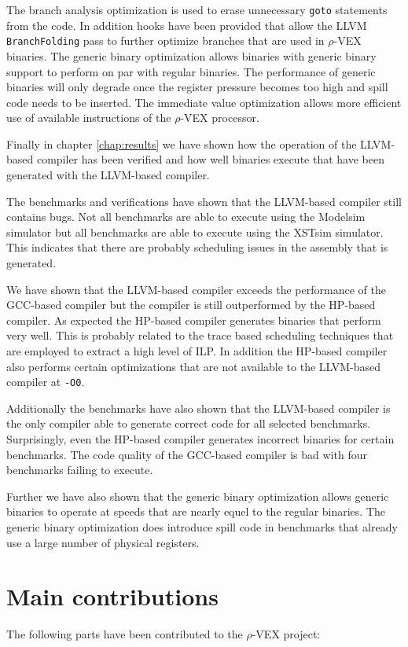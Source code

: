 The branch analysis optimization is used to erase unnecessary \texttt{goto} statements from the code. In addition hooks have been provided that allow the LLVM \texttt{BranchFolding} pass to further optimize branches that are used in $\rho$-VEX binaries. The generic binary optimization allows binaries with generic binary support to perform on par with regular binaries. The performance of generic binaries will only degrade once the register pressure becomes too high and spill code needs to be inserted. The immediate value optimization allows more efficient use of available instructions of the  $\rho$-VEX processor.

Finally in chapter \ref{chap:results} we have shown how the operation of the LLVM-based compiler has been verified and how well binaries execute that have been generated with the LLVM-based compiler.

The benchmarks and verifications have shown that the LLVM-based compiler still contains bugs. Not all benchmarks are able to execute using the Modelsim simulator but all benchmarks are able to execute using the XSTsim simulator. This indicates that there are probably scheduling issues in the assembly that is generated.

We have shown that the LLVM-based compiler exceeds the performance of the GCC-based compiler but the compiler is still outperformed by the HP-based compiler. As expected the HP-based compiler generates binaries that perform very well. This is probably related to the trace based scheduling techniques that are employed to extract a high level of ILP. In addition the HP-based compiler also performs certain optimizations that are not available to the LLVM-based compiler at \texttt{-O0}.

Additionally the benchmarks have also shown that the LLVM-based compiler is the only compiler able to generate correct code for all selected benchmarks. Surprisingly, even the HP-based compiler generates incorrect binaries for certain benchmarks. The code quality of the GCC-based compiler is bad with four benchmarks failing to execute.

Further we have also shown that the generic binary optimization allows generic binaries to operate at speeds that are nearly equel to the regular binaries. The generic binary optimization does introduce spill code in benchmarks that already use a large number of physical registers.

\section{Main contributions}
The following parts have been contributed to the $\rho$-VEX project:

